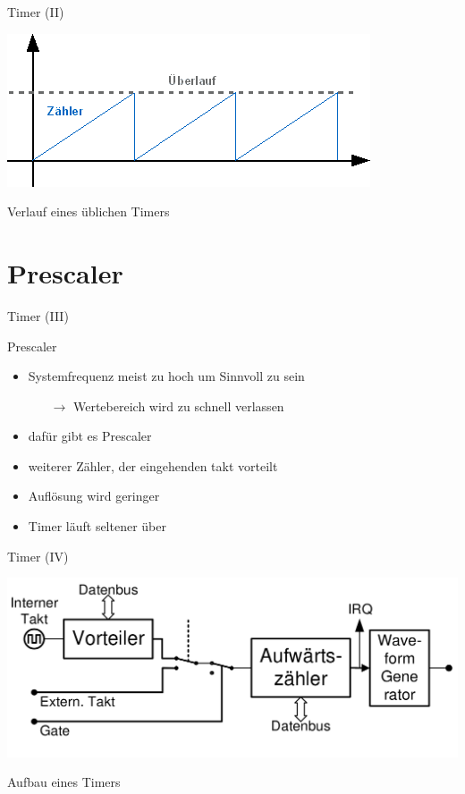   \begin{frame} {Timer (II)}
    \begin{center}
      \includegraphics[width=.8\textwidth]{figs/kurve_timer}  
    \end{center}
    \begin{block} {}
      Verlauf eines üblichen Timers
    \end{block}
  \end{frame}

  \section{Prescaler}
  \begin{frame}{Timer (III)}
    \begin{block} {Prescaler}
      \begin{itemize}
        \item Systemfrequenz meist zu hoch um Sinnvoll zu sein
        \begin{itemize}
          \item[$\rightarrow$] Wertebereich wird zu schnell verlassen
        \end{itemize} 
        \item dafür gibt es Prescaler
        \item weiterer Zähler, der eingehenden takt \glqq{}vorteilt\grqq{}
        \item Auflösung wird geringer
        \item Timer läuft seltener über
      \end{itemize}
    \end{block}
  \end{frame}

  \begin{frame}{Timer (IV)}
    \begin{center}
      \includegraphics[width=\textwidth]{figs/timer_generell}
    \end{center}
    \begin{block} {}
      Aufbau eines Timers
    \end{block}
  \end{frame}

